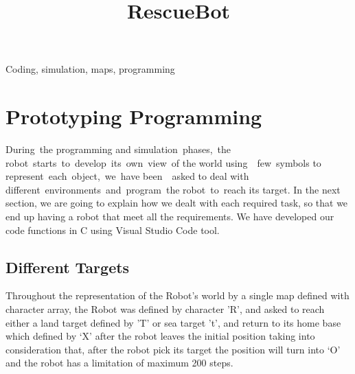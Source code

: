 \documentclass[conference]{IEEEtran}
\begin{document}
\title{RescueBot\\


}

\author{



}


\maketitle



\begin{IEEEkeywords}
Coding, simulation, maps, programming 
\end{IEEEkeywords}




\section{Prototyping Programming}

During the programming and simulation phases, the robot starts to develop its own view of the world using  few symbols to represent each object, we have been  asked to deal with different environments and program the robot to reach its target.
In the next section, we are going to explain how we dealt with each required task, so that we end up having a robot that meet all the requirements. We have developed our code functions in C using Visual Studio Code tool. 


\subsection{Different Targets}

Throughout the  representation of  the Robot's world by a single map defined with character  array, the Robot was defined by character 'R', and asked to  reach either a land target defined by  'T' or sea target 't', and return to its home base which defined by ‘X’ after the robot leaves the initial position taking into consideration that, after the robot pick its  target the position will  turn into ‘O’ and the robot has a limitation of  maximum 200 steps. 
\end{document}
